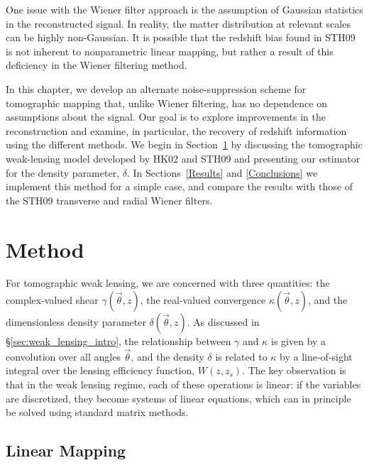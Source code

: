 One issue with the Wiener filter approach is the assumption of
Gaussian statistics in the reconstructed signal.  In reality, the matter 
distribution at relevant scales can be highly non-Gaussian.  
It is possible that the redshift bias found in STH09 is not inherent
to nonparametric linear mapping, but rather a result of this deficiency
in the Wiener filtering method.

In this chapter, we develop an alternate noise-suppression scheme for
tomographic mapping that,  unlike Wiener filtering, has no dependence
on assumptions about the signal.   Our goal is to explore improvements
in the reconstruction and examine, in particular, the recovery of
redshift information using the different methods. We begin in 
Section~\ref{Method} 
by discussing the tomographic weak-lensing model developed by HK02
and STH09 and presenting our estimator for the density parameter, $\delta$.  
In Sections~\ref{Results} and \ref{Conclusions} we implement this method
for a simple case, and compare the results with those of the STH09 transverse
and radial Wiener filters.

\section{Method}
\label{Method}

For tomographic weak lensing, we are concerned with three quantities:  the 
complex-valued shear $\gamma(\vec\theta,z)$, the real-valued convergence
$\kappa(\vec\theta,z)$, and the dimensionless density parameter 
$\delta(\vec\theta,z)$.  As discussed in \S\ref{sec:weak_lensing_intro},
the relationship between $\gamma$ and $\kappa$ is given
by a convolution over all angles $\vec\theta$, and the density $\delta$ is
related to $\kappa$ by a line-of-sight integral over the lensing efficiency
function, $W(z,z_s)$.  The key observation is that in the weak lensing regime,
each of these operations is linear: if the variables are discretized, 
they become systems of linear equations, 
which can in principle be solved using standard matrix methods.

\subsection{Linear Mapping}
\label{LinearMapping}

